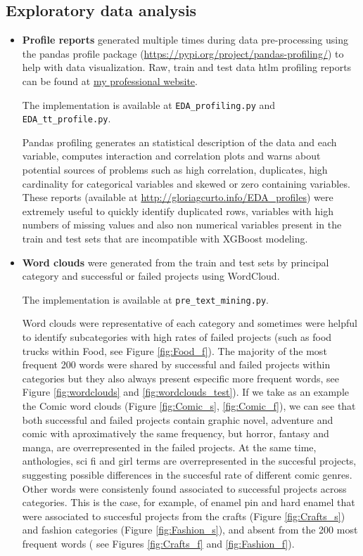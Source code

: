 \documentclass{article}
\begin{document}
\subsection{Exploratory data analysis}
\label{subsec:EDA}
\begin{itemize}

\item \textbf{Profile reports} generated multiple times during data pre-processing using the pandas profile package (\url{https://pypi.org/project/pandas-profiling/}) to help with data visualization. Raw, train and test data htlm profiling reports can be found at \href{http://gloriagcurto.info/EDA_profiles/}{my professional website}.

The implementation is available at {\tt EDA\_profiling.py} and {\tt EDA\_tt\_profile.py}.

Pandas profiling generates an statistical description of the data and each variable, computes interaction and correlation plots and warns about potential sources of problems such as high correlation, duplicates, high cardinality for categorical variables and skewed or zero containing variables.
These reports (available at \url{http://gloriagcurto.info/EDA_profiles}) were extremely useful to quickly identify duplicated rows, variables with high numbers of missing values and also non numerical variables present in the train and test sets that are incompatible with XGBoost modeling.

\item \textbf{Word clouds} were generated from the train and test sets by principal category and successful or failed projects using WordCloud.

The implementation is available at {\tt pre\_text\_mining.py}.

Word clouds were representative of each category and sometimes were helpful to identify subcategories with high rates of failed projects (such as food trucks within Food, see Figure \ref{fig:Food_f}). The majority of the most frequent 200 words were shared by successful and failed projects within categories but they also always present especific more frequent words, see Figure \ref{fig:wordclouds} and \ref{fig:wordclouds_test}).
If we take as an example the Comic word clouds (Figure \ref{fig:Comic_s}, \ref{fig:Comic_f}), we can see that both successful and failed projects contain graphic novel, adventure and comic with aproximatively the same frequency, but horror, fantasy and manga, are overrepresented in the failed projects. At the same time, anthologies, sci fi and girl terms are overrepresented in the succesful projects, suggesting possible differences in the succesful rate of different comic genres.
Other words were consistenly found associated to successful projects across categories. This is the case, for example, of enamel pin and hard enamel that were associated to succesful projects from the crafts (Figure \ref{fig:Crafts_s}) and fashion categories (Figure \ref{fig:Fashion_s}), and absent from the 200 most frequent words ( see Figures \ref{fig:Crafts_f} and \ref{fig:Fashion_f}).


\end{itemize}
\end{document}
